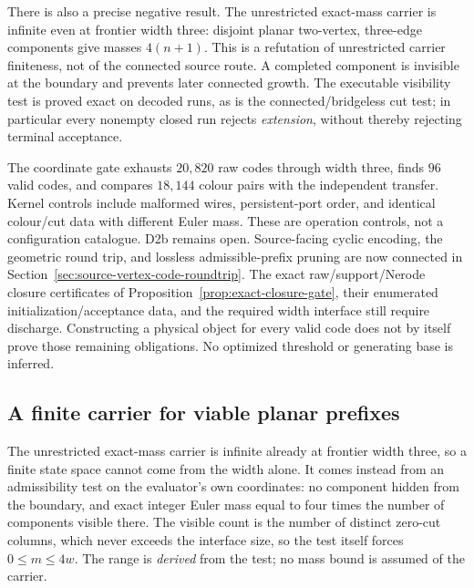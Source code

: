 There is also a precise negative result. The unrestricted exact-mass
carrier is infinite even at frontier width three: disjoint planar
two-vertex, three-edge components give masses $4(n+1)$. This is a
refutation of unrestricted carrier finiteness, not of the connected
source route. A completed component is invisible at the boundary and
prevents later connected growth. The executable visibility test is
proved exact on decoded runs, as is the connected/bridgeless cut test;
in particular every nonempty closed run rejects \emph{extension},
without thereby rejecting terminal acceptance.

The coordinate gate exhausts $20{,}820$ raw codes through width three,
finds $96$ valid codes, and compares $18{,}144$ colour pairs with the
independent transfer. Kernel controls include malformed wires,
persistent-port order, and identical colour/cut data with different
Euler mass. These are operation controls, not a configuration catalogue.
D2b remains open. Source-facing cyclic encoding, the geometric round trip,
and lossless admissible-prefix pruning are now connected in
Section~\ref{sec:source-vertex-code-roundtrip}. The exact raw/support/Nerode
closure certificates of Proposition~\ref{prop:exact-closure-gate}, their
enumerated initialization/acceptance data, and the required width interface
still require discharge. Constructing a physical object for every valid code
does not by itself prove those remaining obligations.
No optimized threshold or generating base is inferred.

\subsection{A finite carrier for viable planar prefixes}
\label{sec:viable-planar-prefix-carrier}

The unrestricted exact-mass carrier is infinite already at frontier width
three, so a finite state space cannot come from the width alone. It comes
instead from an admissibility test on the evaluator's own coordinates: no
component hidden from the boundary, and exact integer Euler mass equal to
four times the number of components visible there. The visible count is the
number of distinct zero-cut columns, which never exceeds the interface size,
so the test itself forces $0\le m\le 4w$. The range is \emph{derived} from
the test; no mass bound is assumed of the carrier.


